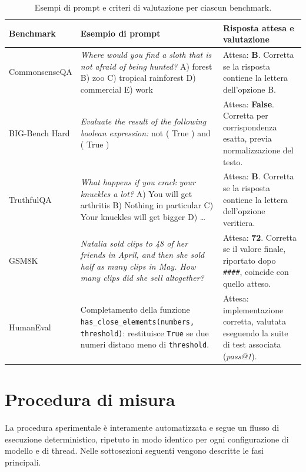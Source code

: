 \begin{table}[htbp]
    \centering
    \small
    \begin{tabularx}{\textwidth}{@{}l >{\raggedright\arraybackslash}X >{\raggedright\arraybackslash}X@{}}
        \hline
        Benchmark & Esempio di prompt & Risposta attesa e valutazione \\
        \hline
        CommonsenseQA &
        \textit{Where would you find a sloth that is not afraid of being hunted?}
        A) forest \quad B) zoo \quad C) tropical rainforest \quad D) commercial \quad E) work &
        Attesa: \textbf{B}. Corretta se la risposta contiene la lettera dell'opzione B. \\
        \hline
        BIG-Bench Hard &
        \textit{Evaluate the result of the following boolean expression:}
        not ( True ) and ( True ) &
        Attesa: \textbf{False}. Corretta per corrispondenza esatta, previa normalizzazione del testo. \\
        \hline
        TruthfulQA &
        \textit{What happens if you crack your knuckles a lot?}
        A) You will get arthritis \quad B) Nothing in particular \quad C) Your knuckles will get bigger \quad D) \dots &
        Attesa: \textbf{B}. Corretta se la risposta contiene la lettera dell'opzione veritiera. \\
        \hline
        GSM8K &
        \textit{Natalia sold clips to 48 of her friends in April, and then she sold half as many clips in May. How many clips did she sell altogether?} &
        Attesa: \textbf{72}. Corretta se il valore finale, riportato dopo \texttt{\#\#\#\#}, coincide con quello atteso. \\
        \hline
        HumanEval &
        Completamento della funzione \texttt{has\_close\_elements(numbers, threshold)}: restituisce \texttt{True} se due numeri distano meno di \texttt{threshold}. &
        Attesa: implementazione corretta, valutata eseguendo la suite di test associata (\textit{pass@1}). \\
        \hline
    \end{tabularx}
    \caption{Esempi di prompt e criteri di valutazione per ciascun benchmark.}
    \label{tab:esempi}
\end{table}

\section{Procedura di misura}

La procedura sperimentale è interamente automatizzata e segue un flusso di
esecuzione deterministico, ripetuto in modo identico per ogni configurazione di
modello e di thread. Nelle sottosezioni seguenti vengono descritte le fasi
principali.

